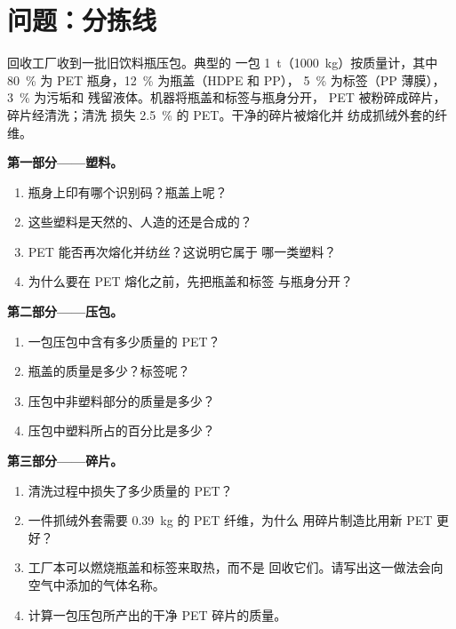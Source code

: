 \section{问题：分拣线}

\begin{problem}
\label{pb:g8:plastics:1}
回收工厂收到一批旧饮料瓶压包。典型的
一包 \qty{1}{t}（\qty{1000}{kg}）按质量计，其中 \qty{80}{\percent} 为
PET 瓶身，\qty{12}{\percent} 为瓶盖（HDPE 和 PP），
\qty{5}{\percent} 为标签（PP 薄膜），\qty{3}{\percent} 为污垢和
残留液体。机器将瓶盖和标签与瓶身分开，
PET 被粉碎成碎片，碎片经清洗；清洗
损失 \qty{2.5}{\percent} 的 PET。干净的碎片被熔化并
纺成抓绒外套的纤维。

\medskip
\noindent\textbf{第一部分——塑料。}
\begin{enumerate}
  \item 瓶身上印有哪个识别码？瓶盖上呢？
  \item 这些塑料是天然的、人造的还是合成的？
  \item PET 能否再次熔化并纺丝？这说明它属于
        哪一类塑料？
  \item 为什么要在 PET 熔化之前，先把瓶盖和标签
        与瓶身分开？
\end{enumerate}

\medskip
\noindent\textbf{第二部分——压包。}
\begin{enumerate}[resume]
  \item 一包压包中含有多少质量的 PET？
  \item 瓶盖的质量是多少？标签呢？
  \item 压包中非塑料部分的质量是多少？
  \item 压包中塑料所占的百分比是多少？
\end{enumerate}

\medskip
\noindent\textbf{第三部分——碎片。}
\begin{enumerate}[resume]
  \item 清洗过程中损失了多少质量的 PET？
  \item 一件抓绒外套需要 \qty{0.39}{kg} 的 PET 纤维，为什么
        用碎片制造比用新 PET 更好？
  \item 工厂本可以燃烧瓶盖和标签来取热，而不是
        回收它们。请写出这一做法会向空气中添加的气体名称。
  \item 计算一包压包所产出的干净 PET 碎片的质量。
\end{enumerate}
\end{problem}
